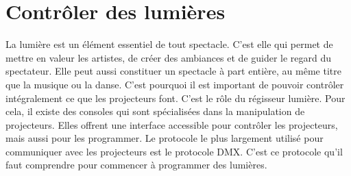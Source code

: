 \section{Contrôler des lumières}
\label{sec:controler_lumieres}

La lumière est un élément essentiel de tout spectacle. C'est elle qui permet de mettre en valeur les artistes, de créer des ambiances et de guider le regard du spectateur.
Elle peut aussi constituer un spectacle à part entière, au même titre que la musique ou la danse.
\newline
C'est pourquoi il est important de pouvoir contrôler intégralement ce que les projecteurs font. C'est le rôle du régisseur lumière.
\newline
Pour cela, il existe des consoles qui sont spécialisées dans la manipulation de projecteurs. Elles offrent une interface accessible pour contrôler les projecteurs, mais aussi pour les programmer.
\newline
Le protocole le plus largement utilisé pour communiquer avec les projecteurs est le protocole DMX. C'est ce protocole qu'il faut comprendre pour commencer à programmer des lumières.
